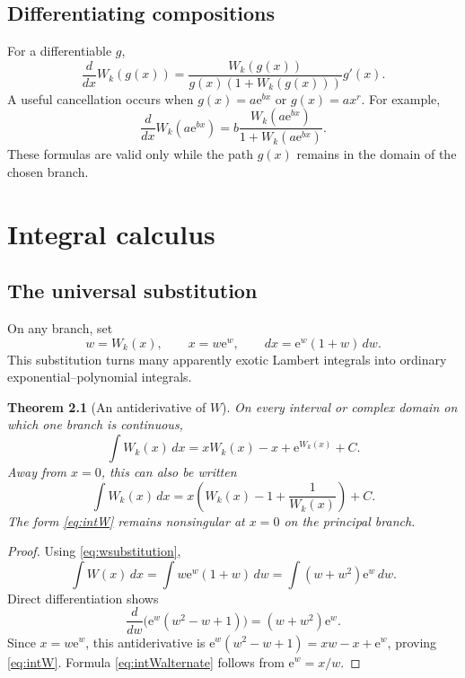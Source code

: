 \documentclass[11pt,oneside]{book}
\newtheorem{theorem}{Theorem}[chapter]
\theoremstyle{definition}
\theoremstyle{remark}
\newcommand{\ee}{\mathrm e}
\begin{document}
\section{Differentiating compositions}

For a differentiable $g$,
\begin{equation}\label{eq:compositionderivative}
 \frac{d}{dx}W_k(g(x))
 =\frac{W_k(g(x))}{g(x)(1+W_k(g(x)))}g'(x).
\end{equation}
A useful cancellation occurs when $g(x)=a\ee^{bx}$ or $g(x)=ax^r$.
For example,
\[
 \frac{d}{dx}W_k(a\ee^{bx})
 =b\frac{W_k(a\ee^{bx})}{1+W_k(a\ee^{bx})}.
\]
These formulas are valid only while the path $g(x)$ remains in the domain of
the chosen branch.

\chapter{Integral calculus}\label{ch:integrals}

\section{The universal substitution}

On any branch, set
\begin{equation}\label{eq:wsubstitution}
 w=W_k(x),\qquad x=w\ee^w,
 \qquad dx=\ee^w(1+w)\,dw.
\end{equation}
This substitution turns many apparently exotic Lambert integrals into
ordinary exponential--polynomial integrals.

\begin{theorem}[An antiderivative of $W$]\label{thm:antiderivative}
On every interval or complex domain on which one branch is continuous,
\begin{equation}\label{eq:intW}
 \int W_k(x)\,dx
 =xW_k(x)-x+\ee^{W_k(x)}+C.
\end{equation}
Away from $x=0$, this can also be written
\begin{equation}\label{eq:intWalternate}
 \int W_k(x)\,dx
 =x\left(W_k(x)-1+\frac1{W_k(x)}\right)+C.
\end{equation}
The form \eqref{eq:intW} remains nonsingular at $x=0$ on the principal
branch.
\end{theorem}

\begin{proof}
Using \eqref{eq:wsubstitution},
\[
 \int W(x)\,dx
 =\int w\ee^w(1+w)\,dw
 =\int(w+w^2)\ee^w\,dw.
\]
Direct differentiation shows
\[
 \frac{d}{dw}\bigl(\ee^w(w^2-w+1)\bigr)
 =(w+w^2)\ee^w.
\]
Since $x=w\ee^w$, this antiderivative is
$\ee^w(w^2-w+1)=xw-x+\ee^w$, proving \eqref{eq:intW}.  Formula
\eqref{eq:intWalternate} follows from $\ee^w=x/w$.
\end{proof}
\end{document}
